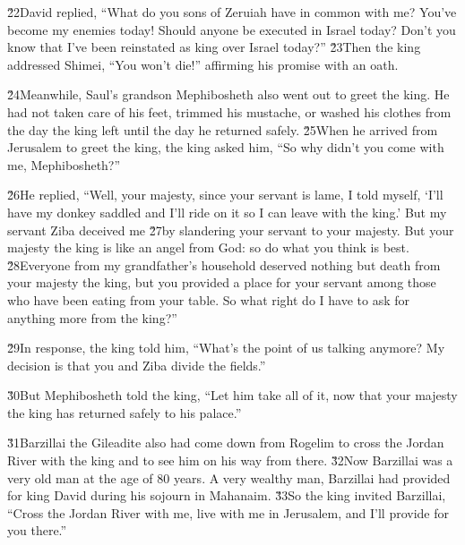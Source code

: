 \v{22}David replied, ``What do you sons of Zeruiah have in common with me? You've become my enemies today! Should anyone be executed in Israel today? Don't you know that I've been reinstated as king over Israel today?'' \v{23}Then the king addressed Shimei, ``You won't die!'' affirming his promise with an oath.

\v{24}Meanwhile, Saul's grandson Mephibosheth also went out to greet the king. He had not taken care of his feet, trimmed his mustache, or washed his clothes from the day the king left until the day he returned safely. \v{25}When he arrived from Jerusalem to greet the king, the king asked him, ``So why didn't you come with me, Mephibosheth?''

\v{26}He replied, ``Well, your majesty, since your servant is lame, I told myself, `I'll have my donkey saddled and I'll ride on it so I can leave with the king.' But my servant Ziba deceived me \v{27}by slandering your servant to your majesty. But your majesty the king is like an angel from God: so do what you think is best. \v{28}Everyone from my grandfather's household deserved nothing but death from your majesty the king, but you provided a place for your servant among those who have been eating from your table. So what right do I have to ask for anything more from the king?''

\v{29}In response, the king told him, ``What's the point of us talking anymore? My decision is that you and Ziba divide the fields.''

\v{30}But Mephibosheth told the king, ``Let him take all of it, now that your majesty the king has returned safely to his palace.''

\v{31}Barzillai the Gileadite also had come down from Rogelim to cross the Jordan River with the king and to see him on his way from there. \v{32}Now Barzillai was a very old man at the age of 80 years. A very wealthy man, Barzillai had provided for king David during his sojourn in Mahanaim. \v{33}So the king invited Barzillai, ``Cross the Jordan River with me, live with me in Jerusalem, and I'll provide for you there.''

